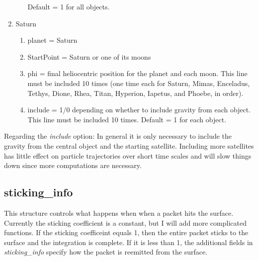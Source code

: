 \documentclass[11pt]{article}
\begin{document}
\begin{enumerate}
\begin{enumerate}
  Default = 1 for all objects.
  \end{enumerate}
\item Saturn
  \begin{enumerate}
  \item planet = Saturn
  \item StartPoint = Saturn or one of its moons
  \item phi = final heliocentric position for the planet and each moon. This 
  line must be included 10 times (one time each for Saturn, Mimas, Enceladus, 
  Tethys, Dione, Rhea, Titan, Hyperion, Iapetus, and Phoebe, in order).
  \item {\color{red}include} = 1/0 depending on whether to include gravity from 
  each object. This line must be included 10 times. Default = 1 for each object.
  \end{enumerate}
\end{enumerate}

Regarding the \textit{include} option: In general it is only necessary to 
include the gravity from the central object and the starting satellite. 
Including more satellites has little effect on particle trajectories over short 
time scales and will slow things down since more computations are necessary.

\subsection{sticking\_info}

This structure controls what happens when when a packet hits the surface. 
Currently the sticking coefficient is a constant, but I will add more 
complicated functions. If the sticking coefficeint equals 1, then the entire 
packet sticks to the surface and the integration is complete. If it is less 
than 1, the additional fields in \textit{sticking\_info} specify how the packet 
is reemitted from the surface.
\end{document}

